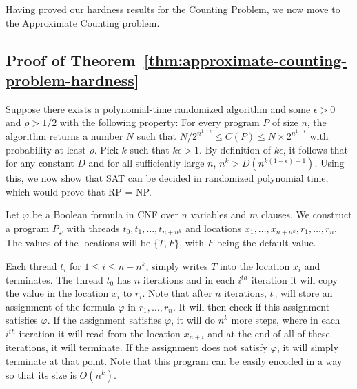 
Having proved our hardness results for the Counting Problem, we now move to the Approximate Counting problem.

\subsection{Proof of Theorem~\ref{thm:approximate-counting-problem-hardness}} \label{theory:B}

Suppose there exists a polynomial-time randomized algorithm and some $\epsilon > 0$
and $\rho > 1/2$
with the following property: For every program $P$ of size $n$,
the algorithm returns a number $N$ such that $N/2^{n^{1-\epsilon}} \le C(P) \le N \times 2^{n^{1-\epsilon}}$ with probability at least $\rho$. Pick $k$ such that $k\epsilon > 1$. By definition of $k\epsilon$, it follows that for any constant $D$ and for all sufficiently large $n$,
$n^k > D(n^{k(1-\epsilon)+1})$. Using this, we now show that SAT can be decided in randomized polynomial time, which would prove that RP = NP. 

Let $\varphi$ be a Boolean formula in CNF over $n$ variables and $m$ clauses.
We construct a program $P_\varphi$ with threads $t_0,t_1,\dots,t_{n+n^k}$ and locations $x_1,\dots,x_{n+n^k}, r_1,\dots,r_n$. 
The values of the locations
will be $\{T,F\}$, with $F$ being the default value. 

Each thread $t_i$ for $1 \le i \le n+n^k$, simply writes $T$ into the location $x_i$
and terminates. The thread $t_0$ has $n$ iterations and in each $i^{th}$ iteration
it will copy the value in the location $x_i$ to $r_i$. Note that
after $n$ iterations, $t_0$ will store an assignment of the formula $\varphi$
in $r_1,\dots,r_n$. It will then check if this assignment satisfies $\varphi$.
If the assignment satisfies $\varphi$, it will do $n^k$ more steps, where in each $i^{th}$ iteration it will read from the location $x_{n+i}$ and at the end of all of 
these iterations, it will terminate.
If the assignment does not satisfy $\varphi$, it will simply terminate at that point.
Note that this program can be easily encoded in a way so that its size is $O(n^k)$.

